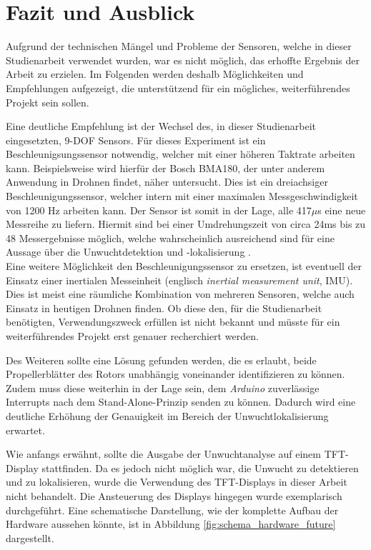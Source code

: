 
\chapter{Fazit und Ausblick}
Aufgrund der technischen Mängel und Probleme der Sensoren, welche in dieser Studienarbeit verwendet wurden, war es nicht möglich, das erhoffte Ergebnis der Arbeit zu erzielen.
Im Folgenden werden deshalb Möglichkeiten und Empfehlungen aufgezeigt, die unterstützend für ein mögliches, weiterführendes Projekt sein sollen.

Eine deutliche Empfehlung ist der Wechsel des, in dieser Studienarbeit eingesetzten, \ac{9-DOF} Sensors.
Für dieses Experiment ist ein Beschleunigsungssensor notwendig, welcher mit einer höheren Taktrate arbeiten kann.
Beispielsweise wird hierfür der Bosch BMA180, der unter anderem Anwendung in Drohnen findet, näher untersucht.
Dies ist ein dreiachsiger Beschleunigungssensor, welcher intern mit einer maximalen Messgeschwindigkeit von 1200 \ac{Hz} arbeiten kann.
Der Sensor ist somit in der Lage, alle 417$\mu$s eine neue Messreihe zu liefern.
Hiermit sind bei einer Umdrehungszeit von circa 24ms bis zu 48 Messergebnisse möglich, welche wahrscheinlich ausreichend sind für eine Aussage über die Unwuchtdetektion und -lokalisierung \cite{bosch_bma180}. \\
Eine weitere Möglichkeit den Beschleunigungssensor zu ersetzen, ist eventuell der Einsatz einer inertialen Messeinheit (englisch \textit{inertial measurement unit}, IMU).
Dies ist meist eine räumliche Kombination von mehreren Sensoren, welche auch Einsatz in heutigen Drohnen finden.
Ob diese den, für die Studienarbeit benötigten, Verwendungszweck erfüllen ist nicht bekannt und müsste für ein weiterführendes Projekt erst genauer recherchiert werden.

Des Weiteren sollte eine Lösung gefunden werden, die es erlaubt, beide Propellerblätter des Rotors unabhängig voneinander identifizieren zu können.
Zudem muss diese weiterhin in der Lage sein, dem \emph{Arduino} zuverlässige Interrupts nach dem Stand-Alone-Prinzip senden zu können.
Dadurch wird eine deutliche Erhöhung der Genauigkeit im Bereich der Unwuchtlokalisierung erwartet.

Wie anfangs erwähnt, sollte die Ausgabe der Unwuchtanalyse auf einem \ac{TFT-Display} stattfinden.
Da es jedoch nicht möglich war, die Unwucht zu detektieren und zu lokalisieren, wurde die Verwendung des \ac{TFT-Display}s in dieser Arbeit nicht behandelt.
Die Ansteuerung des Displays hingegen wurde exemplarisch durchgeführt.
Eine schematische Darstellung, wie der komplette Aufbau der Hardware aussehen könnte, ist in Abbildung \ref{fig:schema_hardware_future} dargestellt.

